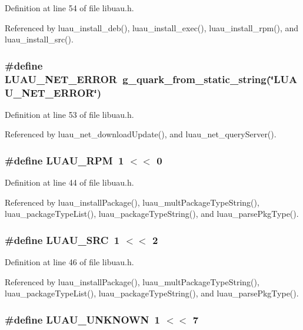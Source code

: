 Definition at line 54 of file libuau.h.

Referenced by luau\_\-install\_\-deb(), luau\_\-install\_\-exec(), luau\_\-install\_\-rpm(), and luau\_\-install\_\-src().
\subsubsection{\setlength{\rightskip}{0pt plus 5cm}\#define LUAU\_\-NET\_\-ERROR\ g\_\-quark\_\-from\_\-static\_\-string(\char`\"{}LUAU\_\-NET\_\-ERROR\char`\"{})}\label{libuau_8h_a14}




Definition at line 53 of file libuau.h.

Referenced by luau\_\-net\_\-download\-Update(), and luau\_\-net\_\-query\-Server().
\subsubsection{\setlength{\rightskip}{0pt plus 5cm}\#define LUAU\_\-RPM\ 1 $<$$<$ 0}\label{libuau_8h_a6}




Definition at line 44 of file libuau.h.

Referenced by luau\_\-install\-Package(), luau\_\-mult\-Package\-Type\-String(), luau\_\-package\-Type\-List(), luau\_\-package\-Type\-String(), and luau\_\-parse\-Pkg\-Type().
\subsubsection{\setlength{\rightskip}{0pt plus 5cm}\#define LUAU\_\-SRC\ 1 $<$$<$ 2}\label{libuau_8h_a8}




Definition at line 46 of file libuau.h.

Referenced by luau\_\-install\-Package(), luau\_\-mult\-Package\-Type\-String(), luau\_\-package\-Type\-List(), luau\_\-package\-Type\-String(), and luau\_\-parse\-Pkg\-Type().
\subsubsection{\setlength{\rightskip}{0pt plus 5cm}\#define LUAU\_\-UNKNOWN\ 1 $<$$<$ 7}\label{libuau_8h_a11}




